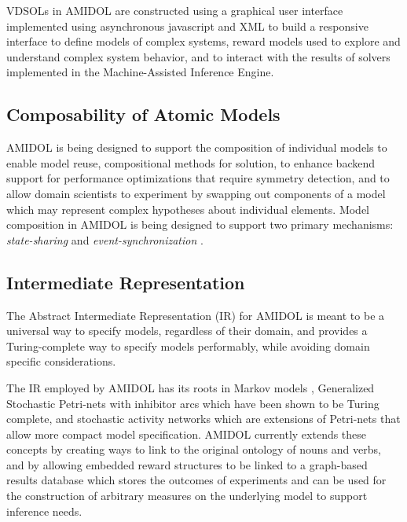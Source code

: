 \documentclass[11pt]{article}
\newcommand{\amidol}{\textsc{AMIDOL}}
\begin{document}
VDSOLs in \amidol{} are constructed using a graphical user interface implemented using asynchronous javascript and XML to build a responsive interface to define models of complex systems, reward models used to explore and understand complex system behavior, and to interact with the results of solvers implemented in the Machine-Assisted Inference Engine.

\subsection{Composability of Atomic Models}

\amidol{} is being designed to support the composition of individual models to enable model reuse, compositional methods for solution, to enhance backend support for performance optimizations that require symmetry detection, and to allow domain scientists to experiment by swapping out components of a model which may represent complex hypotheses about individual elements.  Model composition in \amidol{} is being designed to support two primary mechanisms: \emph{state-sharing} \cite{sanders1992dependability,sanders1988construction} and \emph{event-synchronization} \cite{lampka2002symbolic}.

\subsection{Intermediate Representation}

The Abstract Intermediate Representation (IR) for \amidol{} is meant to be a universal way to specify models, regardless of their domain, and provides a Turing-complete way to specify models performably, while avoiding domain specific considerations.

The IR employed by \amidol{} has its roots in Markov models \cite{howard2012dynamic}, Generalized Stochastic Petri-nets with inhibitor arcs \cite{chiola1993generalized} which have been shown to be Turing complete, and stochastic activity networks \cite{movaghar1985performability,sanders2000stochastic} which are extensions of Petri-nets that allow more compact model specification.  \amidol{} currently extends these concepts by creating ways to link to the original ontology of nouns and verbs, and by allowing embedded reward structures to be linked to a graph-based results database which stores the outcomes of experiments and can be used for the construction of arbitrary measures on the underlying model to support inference needs.
\end{document}
